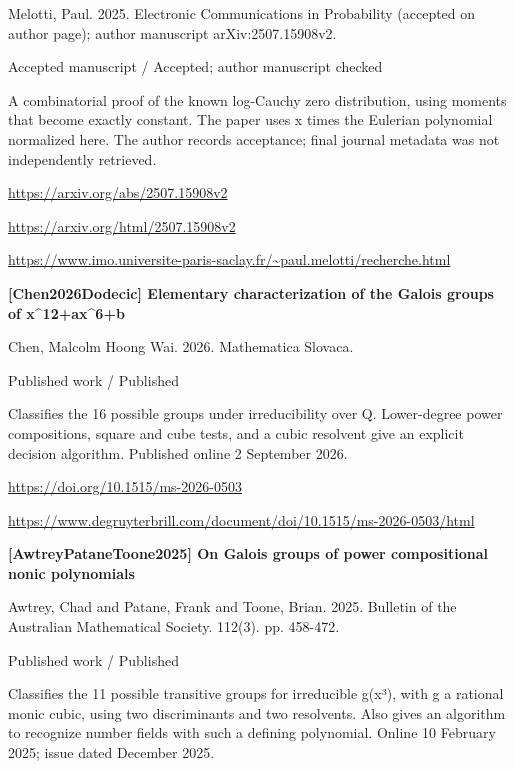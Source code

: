 \documentclass[11pt,a4paper,oneside,openany]{book}
\begin{document}
\color{black} Melotti, Paul. 2025. Electronic Communications in Probability (accepted on author page); author manuscript arXiv:2507.15908v2.\par
{\small\sffamily\color{atlasgold}Accepted manuscript / Accepted; author manuscript checked}\par
\color{black} A combinatorial proof of the known log-Cauchy zero distribution, using moments that become exactly constant. The paper uses x times the Eulerian polynomial normalized here. The author records acceptance; final journal metadata was not independently retrieved.\par
{\footnotesize\url{https://arxiv.org/abs/2507.15908v2}}\par
{\footnotesize\url{https://arxiv.org/html/2507.15908v2}}\par
{\footnotesize\url{https://www.imo.universite-paris-saclay.fr/~paul.melotti/recherche.html}}\par
\vspace{9pt}
\hypertarget{ref:Chen2026Dodecic}{}
{\sffamily\bfseries\color{atlasgreen}[Chen2026Dodecic] Elementary characterization of the Galois groups of x\textasciicircum{}12+ax\textasciicircum{}6+b}\par
\color{black} Chen, Malcolm Hoong Wai. 2026. Mathematica Slovaca.\par
{\small\sffamily\color{atlasgold}Published work / Published}\par
\color{black} Classifies the 16 possible groups under irreducibility over Q. Lower-degree power compositions, square and cube tests, and a cubic resolvent give an explicit decision algorithm. Published online 2 September 2026.\par
{\footnotesize\url{https://doi.org/10.1515/ms-2026-0503}}\par
{\footnotesize\url{https://www.degruyterbrill.com/document/doi/10.1515/ms-2026-0503/html}}\par
\vspace{9pt}
\hypertarget{ref:AwtreyPataneToone2025}{}
{\sffamily\bfseries\color{atlasgreen}[AwtreyPataneToone2025] On Galois groups of power compositional nonic polynomials}\par
\color{black} Awtrey, Chad and Patane, Frank and Toone, Brian. 2025. Bulletin of the Australian Mathematical Society. 112(3). pp. 458-472.\par
{\small\sffamily\color{atlasgold}Published work / Published}\par
\color{black} Classifies the 11 possible transitive groups for irreducible g(x³), with g a rational monic cubic, using two discriminants and two resolvents. Also gives an algorithm to recognize number fields with such a defining polynomial. Online 10 February 2025; issue dated December 2025.\par
\end{document}
